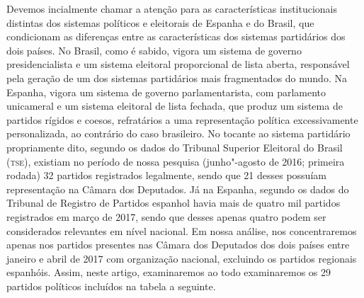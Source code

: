 \noindent{}Devemos incialmente chamar a atenção para as características
institucionais distintas dos sistemas políticos e eleitorais de Espanha
e do Brasil, que condicionam as diferenças entre as características dos
sistemas partidários dos dois países. No Brasil, como é sabido, vigora
um sistema de governo presidencialista e um sistema eleitoral
proporcional de lista aberta, responsável pela geração de um dos
sistemas partidários mais fragmentados do mundo. Na Espanha, vigora um
sistema de governo parlamentarista, com parlamento unicameral e um
sistema eleitoral de lista fechada, que produz um sistema de partidos
rígidos e coesos, refratários a uma representação política
excessivamente personalizada, ao contrário do caso brasileiro. No
tocante ao sistema partidário propriamente dito, segundo os dados do
Tribunal Superior Eleitoral do Brasil (\textsc{tse}), existiam no período de
nossa pesquisa (junho"-agosto de 2016; primeira rodada) 32 partidos
registrados legalmente, sendo que 21 desses possuíam representação na
Câmara dos Deputados. Já na Espanha, segundo os dados do Tribunal de
Registro de Partidos espanhol havia mais de quatro mil partidos
registrados em março de 2017, sendo que desses apenas quatro podem ser
considerados relevantes em nível nacional. Em nossa análise, nos
concentraremos apenas nos partidos presentes nas Câmara dos Deputados
dos dois países entre janeiro e abril de 2017 com organização nacional,
excluindo os partidos regionais espanhóis. Assim, neste artigo,
examinaremos ao todo examinaremos os 29 partidos políticos incluídos na
tabela a seguinte.


